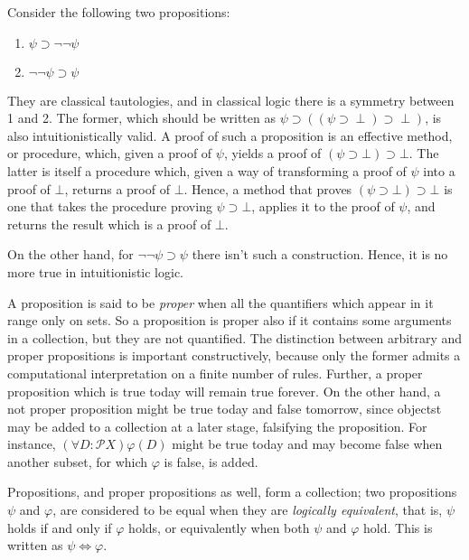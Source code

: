 \begin{example}
  Consider the following two propositions:
  \begin{enumerate}
  \item $\psi\supset\neg\neg\psi$
  \item $\neg\neg\psi\supset\psi$
  \end{enumerate}
  They are classical tautologies, and in classical logic there is a symmetry
  between 1 and 2. The former, which should be written as
  $\psi\supset((\psi\supset\perp)\supset\perp)$, is also intuitionistically
  valid. A proof of such a proposition is an effective method, or procedure,
  which, given a proof of $\psi$, yields a proof of
  $(\psi \supset \bot) \supset \bot$. The latter is itself a procedure which,
  given a way of transforming a proof of $\psi$ into a proof of $\bot$, returns
  a proof of $\bot$. Hence, a method that proves
  $(\psi \supset \bot) \supset \bot$ is one that takes the procedure proving
  $\psi \supset \bot$, applies it to the proof of $\psi$, and returns the result
  which is a proof of $\bot$.
  
  On the other hand, for $\neg\neg\psi\supset\psi$ there isn't such a
  construction. Hence, it is no more true in intuitionistic logic.
\end{example}

A proposition is said to be \textit{proper} when all the quantifiers which
appear in it range only on sets. So a proposition is proper also if it contains
some arguments in a collection, but they are not quantified. The distinction
between arbitrary and proper propositions is important constructively, because
only the former admits a computational interpretation on a finite number of
rules. Further, a proper proposition which is true today will remain true
forever. On the other hand, a not proper proposition might be true today and
false tomorrow, since objectst may be added to a collection at a later stage,
falsifying the proposition. For instance, $(\forall D : \mathcal{P}X)\varphi(D)$
might be true today and may become false when another subset, for which
$\varphi$ is false, is added.

Propositions, and proper propositions as well, form a collection; two
propositions $\psi$ and $\varphi$, are considered to be equal when they are
\textit{logically equivalent}, that is, $\psi$ holds if and only if $\varphi$
holds, or equivalently when both $\psi$ and $\varphi$ hold. This is written as
$\psi \iff \varphi$.


